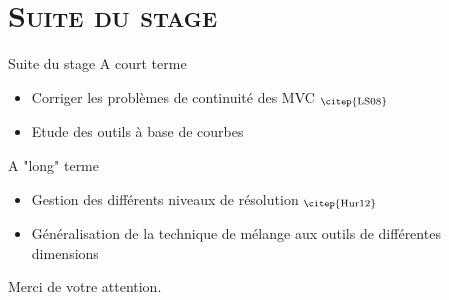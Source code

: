 \documentclass[xcolor=x11names,compress]{beamer}
\renewcommand{\(}{\begin{columns}} \renewcommand{\)}{\end{columns}}
\newcommand{\<}[1]{\begin{column}{#1}} \renewcommand{\>}{\end{column}}
\begin{document}
\section{\scshape Suite du stage}
\begin{frame}{Suite du stage}
  A court terme
  \begin{itemize}
  \item Corriger les problèmes de continuité des MVC
    $_{\text{\citep{LS08}}}$
  \item Etude des outils à base de courbes
  \end{itemize}
  A "long" terme
  \begin{itemize}
  \item Gestion des différents niveaux de résolution $_{\text{\citep{Hur12}}}$
  \item Généralisation de la technique de mélange aux outils de
    différentes dimensions
  \end{itemize}
\end{frame}

\begin{frame}{}
\begin{center}
\huge Merci de votre attention.
\end{center}
\end{frame}

\appendix
\end{document}
